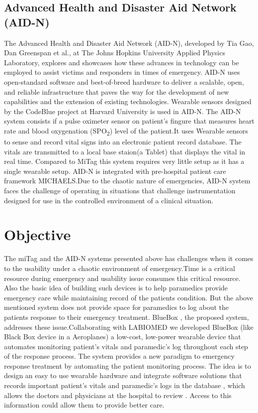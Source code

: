 \subsection{Advanced Health
	and Disaster Aid Network (AID-N)}
The Advanced Health and Disaster Aid Network (AID-N), developed by Tia Gao, Dan Greenspan et al., \cite{AID-N} at The Johns Hopkins University Applied Physics Laboratory, explores and showcases how these advances in technology can be employed to assist victims and responders in times of emergency. AID-N uses open-standard software and best-of-breed hardware to deliver a scalable, open, and reliable infrastructure that paves the way for the development of new capabilities and the extension of existing technologies. 
Wearable sensors designed by the CodeBlue project at Harvard University is used in AID-N. The AID-N system consists if a pulse oximeter sensor on patient's fingure that measures heart rate and blood oxygenation (SPO\textsubscript{2}) level of the patient.It uses Wearable sensors to sense and record vital signs into an electronic patient record database. The vitals are transmitted to a local base staion(a Tablet) that displays the vital in real time. Compared to MiTag this system requires very little setup as it has a single wearable setup. AID-N is integrated with pre-hospital patient care framework MICHAELS.Due to the chaotic nature of emergencies, AID-N system
faces the challenge of operating in situations that challenge instrumentation designed for use in
the controlled environment of a clinical situation. 


\section{Objective}
The miTag and the AID-N systems presented above has challenges when it comes to the usability under a chaotic environment of emergency.Time is a critical resource during emergency and usability issue consumes this critical resource. Also the basic idea of building such devices is to help paramedics provide emergency care while maintaining record of the patients condition. But the above mentioned system does not provide space for paramedics to log about the patients response to their emergency treatment. BlueBox , the proposed system, addresses these issue.Collaborating with LABIOMED we developed BlueBox (like Black Box device in a Aeroplanes) a low-cost, low-power wearable device that automates monitoring patient’s vitals and paramedic's log throughout each step of the response process.  The system provides a new paradigm to emergency response treatment by automating the patient monitoring process. The idea is to design an easy to use wearable hardware and integrate software solutions that records important  patient’s vitals and paramedic's logs in the database , which allows the doctors and physicians at the hospital to review . Access to this information could allow them to provide better care.

